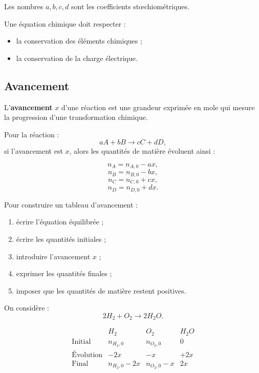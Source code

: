 \documentclass[11pt,a4paper]{article}
\begin{document}
Les nombres $a,b,c,d$ sont les coefficients stœchiométriques.

\begin{alerte}
Une équation chimique doit respecter :
\begin{itemize}
  \item la conservation des éléments chimiques ;
  \item la conservation de la charge électrique.
\end{itemize}
\end{alerte}

\subsection{Avancement}

\begin{definition}
L'\textbf{avancement} $x$ d'une réaction est une grandeur exprimée en mole qui mesure la progression d'une transformation chimique.
\end{definition}

Pour la réaction :
\[
aA+bB \longrightarrow cC+dD,
\]
si l'avancement est $x$, alors les quantités de matière évoluent ainsi :

\[
n_A=n_{A,0}-ax,
\]
\[
n_B=n_{B,0}-bx,
\]
\[
n_C=n_{C,0}+cx,
\]
\[
n_D=n_{D,0}+dx.
\]

\begin{methode}
Pour construire un tableau d'avancement :
\begin{enumerate}
  \item écrire l'équation équilibrée ;
  \item écrire les quantités initiales ;
  \item introduire l'avancement $x$ ;
  \item exprimer les quantités finales ;
  \item imposer que les quantités de matière restent positives.
\end{enumerate}
\end{methode}

\begin{exemple}
On considère :
\[
2H_2+O_2\longrightarrow 2H_2O.
\]

\[
\begin{array}{c|ccc}
 & H_2 & O_2 & H_2O \\
\hline
\text{Initial} & n_{H_2,0} & n_{O_2,0} & 0 \\
\text{Évolution} & -2x & -x & +2x \\
\text{Final} & n_{H_2,0}-2x & n_{O_2,0}-x & 2x \\
\end{array}
\]
\end{exemple}
\end{document}
